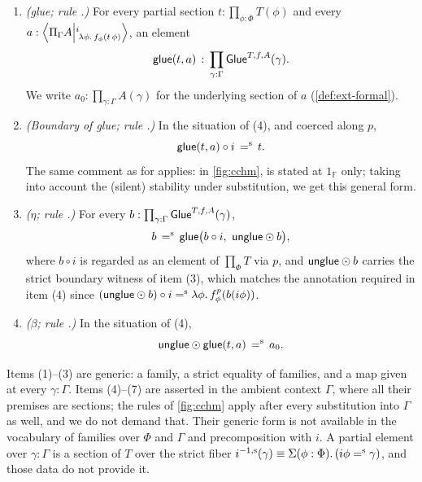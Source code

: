 \begin{definition}
\begin{enumerate}
		denotes $f_\phi$ with its source coerced along the type boundary $p$ of (2).
		This strict equality internalizes the boundary annotation
		$A[\varphi\mapsto f\,b]$ at the \emph{generic} element $b$.
		Consequently, for a section
		$b : \prod_{\gamma:\Gamma}\Glue^{T,f,A}(\gamma)$, the composite
		$\unglue \odot b \colonequiv \lambda\gamma.\,\unglue_\gamma(b\,\gamma)$
		carries a strict boundary witness and is an element of
		$\Ext{i}{\Pi_\Gamma A}{\;\lambda\phi.\,f^p_\phi(b(i\phi))}$,
		the literal reading of  in the ambient context
		$\Gamma$.
		\item \emph{(glue; rule .)} For every partial section
		$t : \prod_{\phi:\Phi} T(\phi)$ and every
		$a : \Ext{i}{\Pi_\Gamma A}{\;\lambda\phi.\,f_\phi(t\,\phi)}$, an
		element
		\[
		\glue(t,a) \,:\, \prod_{\gamma:\Gamma} \Glue^{T,f,A}(\gamma).
		\]
		We write $a_0 : \prod_{\gamma:\Gamma}A(\gamma)$ for the underlying section
		of $a$ (\cref{def:ext-formal}).
		\item \emph{(Boundary of glue; rule .)} In the situation of (4), and coerced along $p$,
		\[
		\glue(t,a)\circ i \,\seq\, t.
		\]
		The same comment as for  applies: in \cref{fig:cchm},  is stated at $1_\mathbb{F}$ only;
		taking into account the (silent) stability under substitution, we get this general form.
		\item \emph{($\eta$; rule .)} For every
		$b : \prod_{\gamma:\Gamma}\Glue^{T,f,A}(\gamma)$,
		\[
		b \,\seq\, \glue\bigl(b\circ i,\ \unglue\odot b\bigr),
		\]
		where $b\circ i$ is regarded as an element of $\prod_\Phi T$ via $p$,
		and $\unglue\odot b$ carries the strict boundary witness of item (3),
		which matches the annotation required in item (4) since
		$(\unglue\odot b)\circ i \seq \lambda\phi.\,f^p_\phi(b(i\phi))$.
		\item \emph{($\beta$; rule .)} In the situation of (4),
		\[
		\unglue\odot\glue(t,a) \,\seq\, a_0.
		\]
	\end{enumerate}
\end{definition}

Items (1)--(3) are generic: a family, a strict equality of families, and a map
given at every $\gamma:\Gamma$. Items (4)--(7) are asserted in the ambient
context $\Gamma$, where all their premises are sections; the rules of \cref{fig:cchm}
apply after every substitution into $\Gamma$ as well, and we do not demand that.
Their generic form is not available in the vocabulary of families over $\Phi$
and $\Gamma$ and precomposition with $i$. A partial element over
$\gamma:\Gamma$ is a section of $T$ over the strict fiber
$\sfib{i}(\gamma) \equiv \Sigma(\phi:\Phi).\,(i\phi\seq\gamma)$, and those data do not
provide it.

